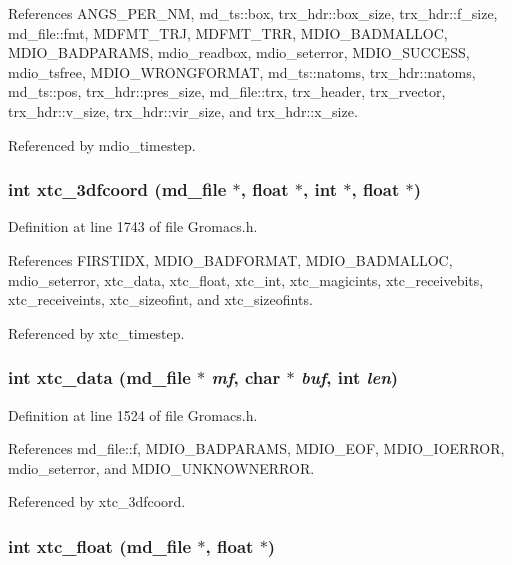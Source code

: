 References ANGS\_\-PER\_\-NM, md\_\-ts::box, trx\_\-hdr::box\_\-size, trx\_\-hdr::f\_\-size, md\_\-file::fmt, MDFMT\_\-TRJ, MDFMT\_\-TRR, MDIO\_\-BADMALLOC, MDIO\_\-BADPARAMS, mdio\_\-readbox, mdio\_\-seterror, MDIO\_\-SUCCESS, mdio\_\-tsfree, MDIO\_\-WRONGFORMAT, md\_\-ts::natoms, trx\_\-hdr::natoms, md\_\-ts::pos, trx\_\-hdr::pres\_\-size, md\_\-file::trx, trx\_\-header, trx\_\-rvector, trx\_\-hdr::v\_\-size, trx\_\-hdr::vir\_\-size, and trx\_\-hdr::x\_\-size.

Referenced by mdio\_\-timestep.
\subsubsection{\setlength{\rightskip}{0pt plus 5cm}int xtc\_\-3dfcoord ({\bf md\_\-file} $\ast$, float $\ast$, int $\ast$, float $\ast$)\hspace{0.3cm}{\tt  [static]}}\label{Gromacs_8h_a56}




Definition at line 1743 of file Gromacs.h.

References FIRSTIDX, MDIO\_\-BADFORMAT, MDIO\_\-BADMALLOC, mdio\_\-seterror, xtc\_\-data, xtc\_\-float, xtc\_\-int, xtc\_\-magicints, xtc\_\-receivebits, xtc\_\-receiveints, xtc\_\-sizeofint, and xtc\_\-sizeofints.

Referenced by xtc\_\-timestep.
\subsubsection{\setlength{\rightskip}{0pt plus 5cm}int xtc\_\-data ({\bf md\_\-file} $\ast$ {\em mf}, char $\ast$ {\em buf}, int {\em len})\hspace{0.3cm}{\tt  [static]}}\label{Gromacs_8h_a69}




Definition at line 1524 of file Gromacs.h.

References md\_\-file::f, MDIO\_\-BADPARAMS, MDIO\_\-EOF, MDIO\_\-IOERROR, mdio\_\-seterror, and MDIO\_\-UNKNOWNERROR.

Referenced by xtc\_\-3dfcoord.
\subsubsection{\setlength{\rightskip}{0pt plus 5cm}int xtc\_\-float ({\bf md\_\-file} $\ast$, float $\ast$)\hspace{0.3cm}{\tt  [static]}}\label{Gromacs_8h_a54}




